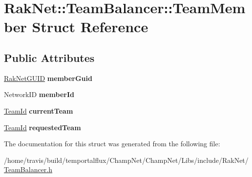 \hypertarget{struct_rak_net_1_1_team_balancer_1_1_team_member}{\section{Rak\-Net\-:\-:Team\-Balancer\-:\-:Team\-Member Struct Reference}
\label{struct_rak_net_1_1_team_balancer_1_1_team_member}
}
\subsection*{Public Attributes}
\begin{DoxyCompactItemize}
\item 
\hypertarget{struct_rak_net_1_1_team_balancer_1_1_team_member_aac7f3b4c5d6192587e52cc804352b839}{\hyperlink{struct_rak_net_1_1_rak_net_g_u_i_d}{Rak\-Net\-G\-U\-I\-D} {\bfseries member\-Guid}}\label{struct_rak_net_1_1_team_balancer_1_1_team_member_aac7f3b4c5d6192587e52cc804352b839}

\item 
\hypertarget{struct_rak_net_1_1_team_balancer_1_1_team_member_aee5eb03d1c253b6ea78f8e511860c91c}{Network\-I\-D {\bfseries member\-Id}}\label{struct_rak_net_1_1_team_balancer_1_1_team_member_aee5eb03d1c253b6ea78f8e511860c91c}

\item 
\hypertarget{struct_rak_net_1_1_team_balancer_1_1_team_member_a5de2ed8f08d7a1339146ae52fab14b43}{\hyperlink{group___t_e_a_m___b_a_l_a_n_c_e_r___g_r_o_u_p_ga79c7825649955f28135498fb3d9f6894}{Team\-Id} {\bfseries current\-Team}}\label{struct_rak_net_1_1_team_balancer_1_1_team_member_a5de2ed8f08d7a1339146ae52fab14b43}

\item 
\hypertarget{struct_rak_net_1_1_team_balancer_1_1_team_member_adc2f82cb5660e2081300a215b326164b}{\hyperlink{group___t_e_a_m___b_a_l_a_n_c_e_r___g_r_o_u_p_ga79c7825649955f28135498fb3d9f6894}{Team\-Id} {\bfseries requested\-Team}}\label{struct_rak_net_1_1_team_balancer_1_1_team_member_adc2f82cb5660e2081300a215b326164b}

\end{DoxyCompactItemize}


The documentation for this struct was generated from the following file\-:\begin{DoxyCompactItemize}
\item 
/home/travis/build/temportalflux/\-Champ\-Net/\-Champ\-Net/\-Libs/include/\-Rak\-Net/\hyperlink{_team_balancer_8h}{Team\-Balancer.\-h}\end{DoxyCompactItemize}
